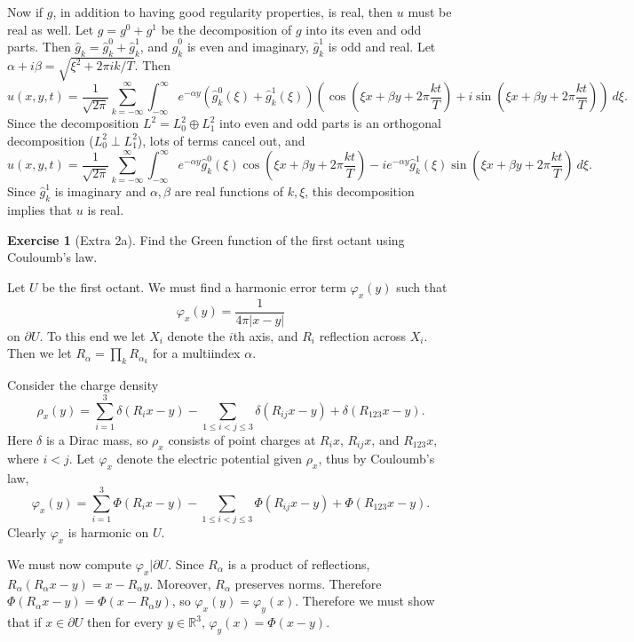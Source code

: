 \documentclass[10pt]{article}
\newcommand{\RR}{\mathbb{R}}
\theoremstyle{definition}
\newtheorem{exer}{Exercise}
\begin{document}
Now if $g$, in addition to having good regularity properties, is real, then $u$ must be real as well.
Let $g = g^0 + g^1$ be the decomposition of $g$ into its even and odd parts.
Then $\hat g_k = \hat g_k^0 + \hat g_k^1$, and $\hat g_k^0$ is even and imaginary, $\hat g_k^1$ is odd and real.
Let $\alpha + i\beta = \sqrt{\xi^2 + 2\pi ik/T}$.
Then
$$u(x, y, t) = \frac{1}{\sqrt{2\pi}} \sum_{k=-\infty}^\infty \int_{-\infty}^\infty e^{-\alpha y} (\hat g_k^0(\xi) + \hat g_k^1(\xi))
 \left(\cos\left(\xi x + \beta y + 2\pi\frac{kt}{T}\right) +i \sin\left(\xi x + \beta y + 2\pi\frac{kt}{T}\right)\right) ~d\xi.$$
Since the decomposition $L^2 = L^2_0 \oplus L^2_1$ into even and odd parts is an orthogonal decomposition ($L^2_0 \perp L^2_1$), lots of terms cancel out, and
$$u(x, y, t) = \frac{1}{\sqrt{2\pi}} \sum_{k=-\infty}^\infty \int_{-\infty}^\infty
e^{-\alpha y} \hat g_k^0(\xi) \cos\left(\xi x + \beta y + 2\pi\frac{kt}{T}\right) - ie^{-\alpha y} \hat g_k^1(\xi) \sin\left(\xi x + \beta y + 2\pi\frac{kt}{T}\right) ~d\xi.$$
Since $\hat g_k^1$ is imaginary and $\alpha,\beta$ are real functions of $k,\xi$, this decomposition implies that $u$ is real.

\begin{exer}[Extra 2a]
Find the Green function of the first octant using Couloumb's law.
\end{exer}

Let $U$ be the first octant. We must find a harmonic error term $\varphi_x(y)$ such that
$$\varphi_x(y) = \frac{1}{4\pi|x - y|}$$
on $\partial U$. To this end we let $X_i$ denote the $i$th axis, and $R_i$ reflection across $X_i$.
Then we let $R_\alpha = \prod_k R_{\alpha_k}$ for a multiindex $\alpha$.

Consider the charge density
$$\rho_x(y) = \sum_{i=1}^3 \delta(R_ix - y) - \sum_{1 \leq i < j \leq 3} \delta(R_{ij}x - y) + \delta(R_{123}x - y).$$
Here $\delta$ is a Dirac mass, so $\rho_x$ consists of point charges at $R_ix$, $R_{ij}x$, and $R_{123}x$, where $i < j$.
Let $\varphi_x$ denote the electric potential given $\rho_x$, thus by Couloumb's law,
$$\varphi_x(y) = \sum_{i=1}^3 \Phi(R_ix - y) - \sum_{1 \leq i < j \leq 3} \Phi(R_{ij}x - y) + \Phi(R_{123}x - y).$$
Clearly $\varphi_x$ is harmonic on $U$.

We must now compute $\varphi_x|\partial U$. Since $R_\alpha$ is a product of reflections, $R_\alpha(R_\alpha x - y) = x - R_\alpha y$.
Moreover, $R_\alpha$ preserves norms. Therefore $\Phi(R_\alpha x - y) = \Phi(x - R_\alpha y)$, so $\varphi_x(y) = \varphi_y(x)$.
Therefore we must show that if $x \in \partial U$ then for every $y \in \RR^3$, $\varphi_y(x) = \Phi(x - y)$.
\end{document}
